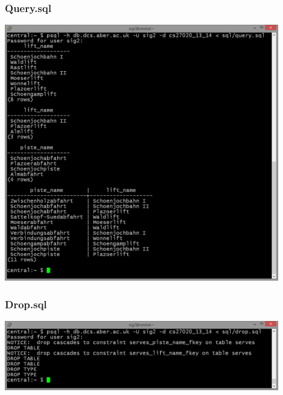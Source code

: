 \documentclass[titlepage ,12pt]{article}
\begin{document}
\subsubsection{Query.sql}
\FloatBarrier
\includegraphics[width=0.9\textwidth]{images/query}\\
\subsubsection{Drop.sql}
\FloatBarrier
\includegraphics[width=0.9\textwidth]{images/drop}
\end{document}

